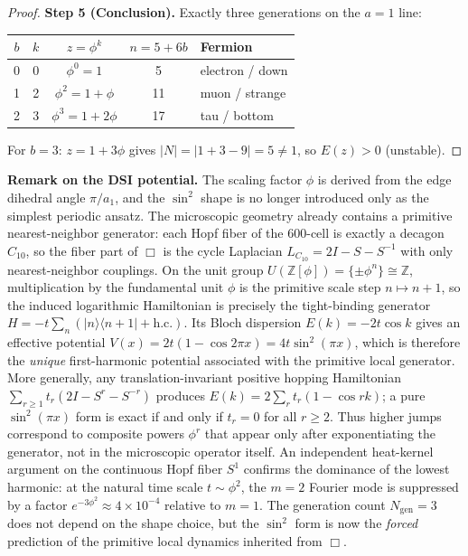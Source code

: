\documentclass[12pt,a4paper]{article}
\theoremstyle{definition}
\begin{document}
\begin{proof}
\textbf{Step 5 (Conclusion).} Exactly three generations on the $a = 1$ line:
\begin{center}
\begin{tabular}{ccccl}
\toprule
$b$ & $k$ & $z = \phi^k$ & $n = 5 + 6b$ & Fermion \\
\midrule
0 & 0 & $\phi^0 = 1$ & 5 & electron / down \\
1 & 2 & $\phi^2 = 1+\phi$ & 11 & muon / strange \\
2 & 3 & $\phi^3 = 1+2\phi$ & 17 & tau / bottom \\
\bottomrule
\end{tabular}
\end{center}
For $b = 3$: $z = 1 + 3\phi$ gives $|N| = |1 + 3 - 9| = 5 \neq 1$, so $E(z) > 0$ (unstable).
\end{proof}

\textbf{Remark on the DSI potential.} The scaling factor $\phi$ is derived from the edge dihedral angle $\pi/a_1$, and the $\sin^2$ shape is no longer introduced only as the simplest periodic ansatz.  The microscopic geometry already contains a primitive nearest-neighbor generator: each Hopf fiber of the 600-cell is exactly a decagon $C_{10}$, so the fiber part of $\Box$ is the cycle Laplacian $L_{C_{10}} = 2I - S - S^{-1}$ with only nearest-neighbor couplings.  On the unit group $U(\mathbb{Z}[\phi]) = \{\pm \phi^n\} \cong \mathbb{Z}$, multiplication by the fundamental unit $\phi$ is the primitive scale step $n \mapsto n+1$, so the induced logarithmic Hamiltonian is precisely the tight-binding generator $H = -t\sum_n(|n\rangle\langle n\!+\!1| + \text{h.c.})$.  Its Bloch dispersion $E(k) = -2t\cos k$ gives an effective potential $V(x) = 2t(1 - \cos 2\pi x) = 4t\sin^2(\pi x)$, which is therefore the \emph{unique} first-harmonic potential associated with the primitive local generator.  More generally, any translation-invariant positive hopping Hamiltonian $\sum_{r\ge1} t_r(2I - S^r - S^{-r})$ produces $E(k) = 2\sum_r t_r(1-\cos rk)$; a pure $\sin^2(\pi x)$ form is exact if and only if $t_r = 0$ for all $r \ge 2$.  Thus higher jumps correspond to composite powers $\phi^r$ that appear only after exponentiating the generator, not in the microscopic operator itself.  An independent heat-kernel argument on the continuous Hopf fiber $S^1$ confirms the dominance of the lowest harmonic: at the natural time scale $t \sim \phi^2$, the $m = 2$ Fourier mode is suppressed by a factor $e^{-3\phi^2} \approx 4 \times 10^{-4}$ relative to $m = 1$.  The generation count $N_{\text{gen}} = 3$ does not depend on the shape choice, but the $\sin^2$ form is now the \emph{forced} prediction of the primitive local dynamics inherited from $\Box$.
\end{document}
